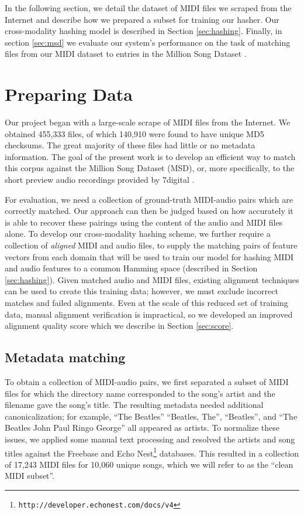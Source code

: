\documentclass{article}
\begin{document}
In the following section, we detail the dataset of MIDI files we scraped from the Internet and describe how we prepared a subset for training our hasher.
Our cross-modality hashing model is described in Section \ref{sec:hashing}.
Finally, in section \ref{sec:msd} we evaluate our system's performance on the task of matching files from our MIDI dataset to entries in the Million Song Dataset \cite{bertin2011million}.

\section{Preparing Data}
\label{sec:dataset}

Our project began with a large-scale scrape of MIDI files from the Internet.
We obtained 455,333 files, of which 140,910 were found to have unique MD5 checksums.
The great majority of these files had little or no metadata information.
The goal of the present work is to develop an efficient way to match this corpus against the Million Song Dataset (MSD), or, more specifically, to the short preview audio recordings provided by 7digital \cite{schindler2012facilitating}.

For evaluation, we need a collection of ground-truth MIDI-audio pairs which are correctly matched.
Our approach can then be judged based on how accurately it is able to recover these pairings using the content of the audio and MIDI files alone.
To develop our cross-modality hashing scheme, we further require a collection of {\em aligned} MIDI and audio files, to supply the matching pairs of feature vectors from each domain that will be used to train our model for hashing MIDI and audio features to a common Hamming space (described in Section \ref{sec:hashing}).
Given matched audio and MIDI files, existing alignment techniques can be used to create this training data; however, we must exclude incorrect matches and failed alignments.
Even at the scale of this reduced set of training data, manual alignment verification is impractical, so we developed an improved alignment quality score which we describe in Section \ref{sec:score}.

\subsection{Metadata matching}

To obtain a collection of MIDI-audio pairs, we first separated a subset of MIDI files for which the directory name corresponded to the song's artist and the filename gave the song's title.
The resulting metadata needed additional canonicalization; for example, ``The Beatles'' ``Beatles, The'', ``Beatles'', and ``The Beatles John Paul Ringo George'' all appeared as artists.
To normalize these issues, we applied some manual text processing and resolved the artists and song titles against the Freebase \cite{bollacker2008freebase} and Echo Nest\footnote{\texttt{http://developer.echonest.com/docs/v4}} databases.
This resulted in a collection of 17,243 MIDI files for 10,060 unique songs, which we will refer to as the ``clean MIDI subset''.
\end{document}
